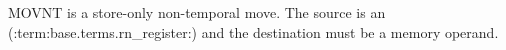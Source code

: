 MOVNT is a store-only non-temporal move. The source is an (:term:base.terms.rn_register:) and the destination must be a memory operand.
